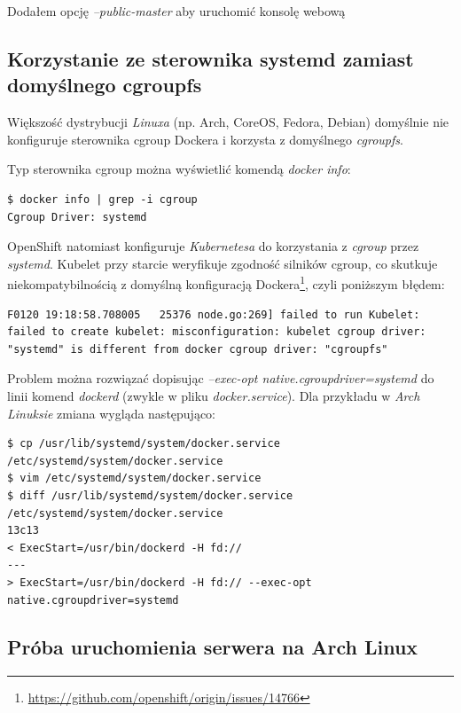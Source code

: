 \documentclass[a4paper,12pt,twoside,openany]{report}
\DeclareRobustCommand{\href}[2]{#2\footnote{\url{#1}}}
\begin{document}
Dodałem opcję \emph{--public-master} aby uruchomić konsolę webową

\hypertarget{korzystanie-ze-sterownika-systemd-zamiast-domyux15blnego-cgroupfs}{%
\subsection{Korzystanie ze sterownika systemd zamiast domyślnego
cgroupfs}\label{korzystanie-ze-sterownika-systemd-zamiast-domyux15blnego-cgroupfs}}

Większość dystrybucji \emph{Linuxa} (np. Arch, CoreOS, Fedora, Debian)
domyślnie nie konfiguruje sterownika cgroup Dockera i korzysta z
domyślnego \emph{cgroupfs}.

Typ sterownika cgroup można wyświetlić komendą \emph{docker info}:

\begin{lstlisting}
$ docker info | grep -i cgroup
Cgroup Driver: systemd
\end{lstlisting}

OpenShift natomiast konfiguruje \emph{Kubernetesa} do korzystania z
\emph{cgroup} przez \emph{systemd}. Kubelet przy starcie weryfikuje
zgodność silników cgroup, co
\href{https://github.com/openshift/origin/issues/14766}{skutkuje
niekompatybilnością z domyślną konfiguracją Dockera}, czyli poniższym
błędem:

\begin{lstlisting}
F0120 19:18:58.708005   25376 node.go:269] failed to run Kubelet: failed to create kubelet: misconfiguration: kubelet cgroup driver: "systemd" is different from docker cgroup driver: "cgroupfs"
\end{lstlisting}

Problem można rozwiązać dopisując \emph{--exec-opt
native.cgroupdriver=systemd} do linii komend \emph{dockerd} (zwykle w
pliku \emph{docker.service}). Dla przykładu w \emph{Arch Linuksie}
zmiana wygląda następująco:

\begin{lstlisting}
$ cp /usr/lib/systemd/system/docker.service /etc/systemd/system/docker.service
$ vim /etc/systemd/system/docker.service
$ diff /usr/lib/systemd/system/docker.service /etc/systemd/system/docker.service
13c13
< ExecStart=/usr/bin/dockerd -H fd://
---
> ExecStart=/usr/bin/dockerd -H fd:// --exec-opt native.cgroupdriver=systemd
\end{lstlisting}

\hypertarget{pruxf3ba-uruchomienia-serwera-na-arch-linux}{%
\subsection{Próba uruchomienia serwera na Arch
Linux}\label{pruxf3ba-uruchomienia-serwera-na-arch-linux}}
\end{document}
